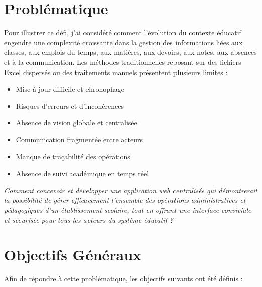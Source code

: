 \documentclass[12pt,a4paper]{report}
\begin{document}
    \section{Problématique}

    Pour illustrer ce défi, j'ai considéré comment l'évolution du contexte éducatif engendre une complexité croissante dans la gestion des informations liées aux classes, aux emplois du temps, aux matières, aux devoirs, aux notes, aux absences et à la communication. Les méthodes traditionnelles reposant sur des fichiers Excel dispersés ou des traitements manuels présentent plusieurs limites :

    \begin{itemize}
        \item Mise à jour difficile et chronophage
        \item Risques d'erreurs et d'incohérences
        \item Absence de vision globale et centralisée
        \item Communication fragmentée entre acteurs
        \item Manque de traçabilité des opérations
        \item Absence de suivi académique en temps réel
    \end{itemize}

    \vspace{0.3cm}
    \begin{center}
    \colorbox{softgray}{%
    \parbox{0.88\textwidth}{%
        \vspace{0.3cm}
        \centering\itshape
        Comment concevoir et développer une application web centralisée qui démontrerait la possibilité de gérer efficacement l'ensemble des opérations administratives et pédagogiques d'un établissement scolaire, tout en offrant une interface conviviale et sécurisée pour tous les acteurs du système éducatif ?
        \vspace{0.3cm}
    }%
    }
    \end{center}
    \vspace{0.3cm}

    \section{Objectifs Généraux}

    Afin de répondre à cette problématique, les objectifs suivants ont été définis :
\end{document}
